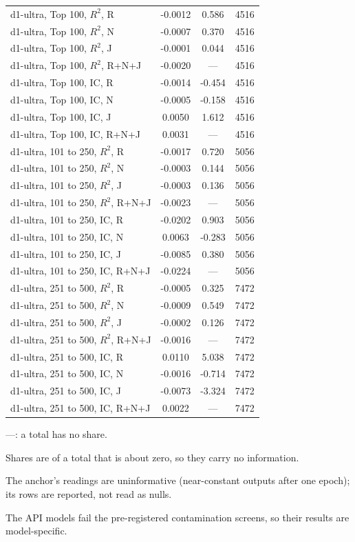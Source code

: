 \begin{longtable}{@{}lS[table-format=-1.4]S[table-format=-1.3]S[table-format=5.0]@{}}
d1-ultra, Top 100, $R^2$, R & -0.0012 & 0.586 & 4516 \\
d1-ultra, Top 100, $R^2$, N & -0.0007 & 0.370 & 4516 \\
d1-ultra, Top 100, $R^2$, J & -0.0001 & 0.044 & 4516 \\
d1-ultra, Top 100, $R^2$, R+N+J & -0.0020 & {---} & 4516 \\
d1-ultra, Top 100, IC, R & -0.0014 & -0.454 & 4516 \\
d1-ultra, Top 100, IC, N & -0.0005 & -0.158 & 4516 \\
d1-ultra, Top 100, IC, J & 0.0050 & 1.612 & 4516 \\
d1-ultra, Top 100, IC, R+N+J & 0.0031 & {---} & 4516 \\
d1-ultra, 101 to 250, $R^2$, R & -0.0017 & 0.720 & 5056 \\
d1-ultra, 101 to 250, $R^2$, N & -0.0003 & 0.144 & 5056 \\
d1-ultra, 101 to 250, $R^2$, J & -0.0003 & 0.136 & 5056 \\
d1-ultra, 101 to 250, $R^2$, R+N+J & -0.0023 & {---} & 5056 \\
d1-ultra, 101 to 250, IC, R & -0.0202 & 0.903 & 5056 \\
d1-ultra, 101 to 250, IC, N & 0.0063 & -0.283 & 5056 \\
d1-ultra, 101 to 250, IC, J & -0.0085 & 0.380 & 5056 \\
d1-ultra, 101 to 250, IC, R+N+J & -0.0224 & {---} & 5056 \\
d1-ultra, 251 to 500, $R^2$, R & -0.0005 & 0.325 & 7472 \\
d1-ultra, 251 to 500, $R^2$, N & -0.0009 & 0.549 & 7472 \\
d1-ultra, 251 to 500, $R^2$, J & -0.0002 & 0.126 & 7472 \\
d1-ultra, 251 to 500, $R^2$, R+N+J & -0.0016 & {---} & 7472 \\
d1-ultra, 251 to 500, IC, R & 0.0110 & 5.038 & 7472 \\
d1-ultra, 251 to 500, IC, N & -0.0016 & -0.714 & 7472 \\
d1-ultra, 251 to 500, IC, J & -0.0073 & -3.324 & 7472 \\
d1-ultra, 251 to 500, IC, R+N+J & 0.0022 & {---} & 7472 \\
\end{longtable}
\endgroup
\vspace{-0.5\baselineskip}
{\footnotesize\raggedright
---: a total has no share.\par
Shares are of a total that is about zero, so they carry no information.\par
The anchor's readings are uninformative (near-constant outputs after one epoch); its rows are reported, not read as nulls.\par
The API models fail the pre-registered contamination screens, so their results are model-specific.\par
}
